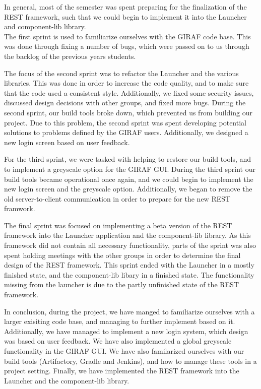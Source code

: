 In general, most of the semester was spent preparing for the finalization of the
REST framework, such that we could begin to implement it into the Launcher and
component-lib library.\\
The first sprint is used to familiarize ourselves with the GIRAF code base. This
was done through fixing a number of bugs, which were passed on to us through the
backlog of the previous years students.\nl

The focus of the second sprint was to refactor the Launcher and the various
libraries. This was done in order to increase the code quality, and to make sure
that the code used a consistent style. Additionally, we fixed some security
issues, discussed design decisions with other groups, and fixed more bugs.
During the second sprint, our build tools broke down, which prevented us from
building our project. Due to this problem, the second sprint was spent
developing potential solutions to problems defined by the GIRAF users.
Additionally, we designed a new login screen based on user feedback.\nl

For the third sprint, we were tasked with helping to restore our build tools,
and to implement a greyscale option for the GIRAF GUI. During the third sprint our build
tools became operational once again, and we could begin to implement the new
login screen and the greyscale option. Additionally, we began to remove the old
server-to-client communication in order to prepare for the new REST framwork.\nl

The final sprint was focused on implementing a beta version of the REST
framework into the Launcher application and the component-lib library. As this
framework did not contain all necessary functionality, parts of the sprint was
also spent holding meetings with the other groups in order to determine the
final design of the REST framework. This sprint ended with the Launcher in a
mostly finished state, and the component-lib libary in a finished state. The
functionality missing from the launcher is due to the partly unfinished state of
the REST framework.\nl

In conclusion, during the project, we have manged to familiarize ourselves with
a larger exisiting code base, and managing to further implement based on it.
Additionally, we have managed to implement a new login system, which design was
based on user feedback. We have also implemented a global greyscale
functionality in the GIRAF GUI. We have also familarized ourselves with
our build tools (Artifactory, Gradle and Jenkins), and how to manage
these tools in a project setting. Finally, we have implemented the REST
framework into the Launcher and the component-lib library.




